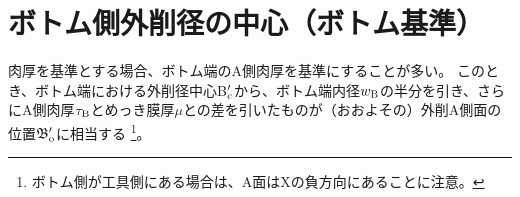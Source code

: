 \section{ボトム側外削径の中心（ボトム基準）}
肉厚を基準とする場合、ボトム端のA側肉厚を基準にすることが多い。
このとき、ボトム端における外削径中心B$_\text c'$から、ボトム端内径$w_\text B$の半分を引き、さらにA側肉厚$\tau_\text B$とめっき膜厚$\mu$との差を引いたものが（おおよその）外削A側面の位置$\mathfrak B_\text o'$に相当する
\footnote{ボトム側が工具側にある場合は、A面はXの負方向にあることに注意。}。


